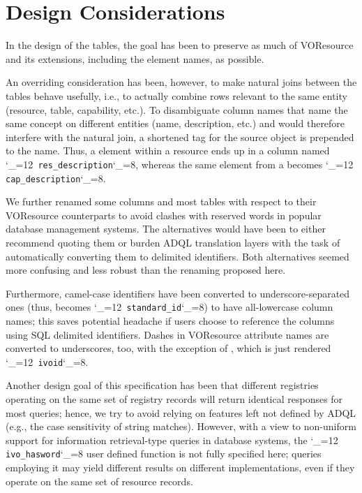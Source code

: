 \documentclass[11pt,a4paper]{ivoa}
\makeatletter
\def\rtent#1{\texttt{\color{rtcolor}\verb|#1|}}
\def\makeunderscoreletter{\catcode`\_=12}
\def\makeunderscoresubscript{\catcode`\_=8}
\def\rtent{\makeunderscoreletter\relax\rt@nt}
\def\rt@nt#1{\texttt{\color{rtcolor} #1}\makeunderscoresubscript{}}
\makeatother
\begin{document}
\section{Design Considerations}

\label{design}

In the design of the tables, the goal has been to preserve as much of
VOResource and its extensions, including the element names, as
possible.

An overriding consideration has been, however, to make natural joins
between the tables behave usefully, i.e., to actually combine rows
relevant to the same entity (resource, table, capability, etc.).
To disambiguate column names that name the same concept on different
entities (name, description, etc.) and would therefore interfere with
the natural join, a shortened tag for the source object
is prepended to the name.  Thus, a  element within
a resource ends up in a column named
\rtent{res_description}, whereas the same element from a
 becomes \rtent{cap_description}.

We further renamed some columns and most tables
with respect to their VOResource
counterparts to avoid clashes with reserved words in popular database
management systems.  The alternatives would have been to either recommend
quoting them or burden ADQL translation layers with the task of
automatically converting them to delimited identifiers.  Both
alternatives seemed more confusing and less robust than the renaming
proposed here.

Furthermore, camel-case identifiers have been converted to
underscore-separated ones (thus,   becomes
\rtent{standard_id}) to have all-lowercase column names; this saves
potential headache if users choose to reference the columns using SQL
delimited identifiers.  Dashes in VOResource attribute names are
converted to underscores, too, with the exception of
, which is just rendered \rtent{ivoid}.

Another design goal of this specification has been that different registries
operating on the same set of registry records will return identical responses
for most queries; hence, we try to avoid relying on features left not
defined by ADQL (e.g., the case sensitivity of string matches).  However,
with a view to non-uniform support for information retrieval-type
queries in database systems, the \rtent{ivo_hasword} user defined
function is not fully specified here; queries employing it may yield
different results on different implementations, even if they operate on
the same set of resource records.
\end{document}
